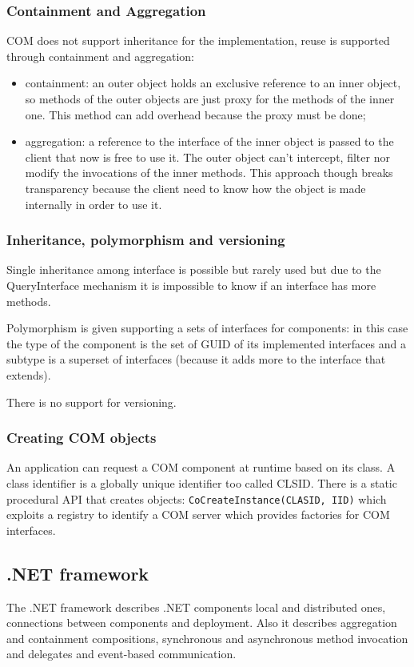 \subsubsection{Containment and Aggregation}
COM does not support inheritance for the implementation, reuse is supported through containment and aggregation:
\begin{itemize}
    \item containment: an outer object holds an exclusive reference to an inner object, so methods of the outer objects are just proxy for the methods of the inner one.
    This method can add overhead because the proxy must be done;

    \item aggregation: a reference to the interface of the inner object is passed to the client that now is free to use it.
    The outer object can't intercept, filter nor modify the invocations of the inner methods.
    This approach though breaks transparency because the client need to know how the object is made internally in order to use it.
\end{itemize}

\subsubsection{Inheritance, polymorphism and versioning}
Single inheritance among interface is possible but rarely used but due to the QueryInterface mechanism it is impossible to know if an interface has more methods.

Polymorphism is given supporting a sets of interfaces for components: in this case the type of the component is the set of GUID of its implemented interfaces and a subtype is a superset of interfaces (because it adds more to the interface that extends).

There is no support for versioning.

\subsubsection{Creating COM objects}
An application can request a COM component at runtime based on its class.
A class identifier is a globally unique identifier too called CLSID.
There is a static procedural API that creates objects: \verb|CoCreateInstance(CLASID, IID)| which exploits a registry to identify a COM server which provides factories for COM interfaces.

\subsection{.NET framework}
The .NET framework describes .NET components local and distributed ones, connections between components and deployment.
Also it describes aggregation and containment compositions, synchronous and asynchronous method invocation and delegates and event-based communication.

